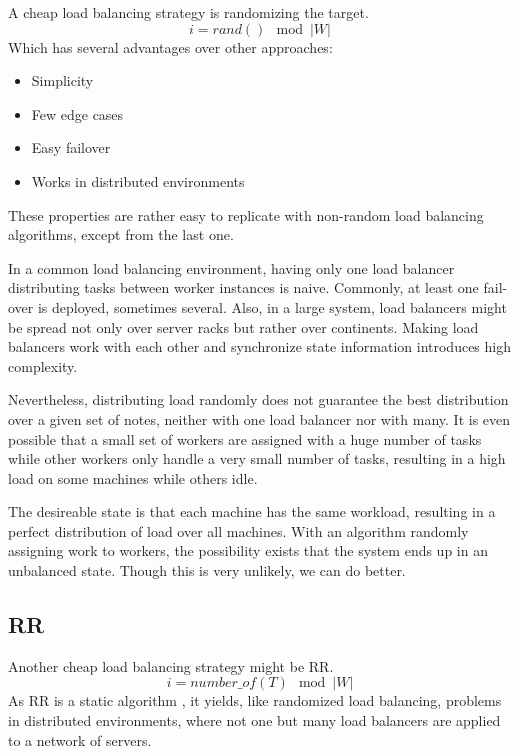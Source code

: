 A cheap load balancing strategy is randomizing the target.
\begin{equation}
	i = rand() \mod |W|
\end{equation}
Which has several advantages over other approaches:
\begin{itemize}
    \item Simplicity
    \item Few edge cases
    \item Easy failover
	\item Works in distributed environments
\end{itemize} %
These properties are rather easy to replicate with non-random load balancing
algorithms, except from the last one.

In a common load balancing environment, having only one load balancer
distributing tasks between worker instances is naive.
Commonly, at least one fail-over is deployed, sometimes several.
Also, in a large system, load balancers might be spread not only over server
racks but rather over continents.
Making load balancers work with each other and synchronize state information
introduces high complexity.

Nevertheless, distributing load randomly does not guarantee the best
distribution
over a given set of notes, neither with one load balancer nor with many.
It is even possible that a small set of workers are assigned
with a huge number of tasks while other workers only handle a very small number
of tasks, resulting in a high load on some machines while others idle.

The desireable state is that each machine has the same workload, resulting in a
perfect distribution of load over all machines.
With an algorithm randomly assigning work to workers, the possibility exists
that the system ends up in an unbalanced state.
Though this is very unlikely, we can do better.

\subsection{\ac{RR}}
	\label{chap:algo:rr}

Another cheap load balancing strategy might be \ac{RR}.
\begin{equation}
	i = number\_of(T) \mod |W|
\end{equation}
As \ac{RR} is a static algorithm \cite{availabilityLBinCC},
it yields, like randomized load balancing, problems in distributed
environments, where not one but many load balancers are applied to a network of
servers.

